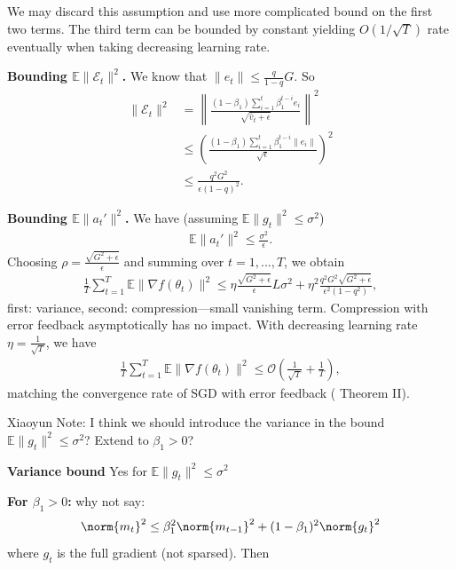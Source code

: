 \documentclass[11pt]{article}
\begin{document}
We may discard this assumption and use more complicated bound on the first two terms. The third term can be bounded by constant yielding $O(1/\sqrt T)$ rate eventually when taking decreasing learning rate.

\textbf{Bounding $\mathbb E\|\mathcal E_t\|^2$.} We know that $\|e_t\|\leq \frac{q}{1-q} G$. So
\begin{align*}
    \|\mathcal E_t\|^2&=\left\| \frac{(1-\beta_1)\sum_{i=1}^{t} \beta_1^{t-i} e_i}{\sqrt{\hat v_t+\epsilon}} \right\|^2\\
    &\leq \left(\frac{(1-\beta_1)\sum_{i=1}^{t} \beta_1^{t-i} \|e_i\|}{\sqrt\epsilon}\right)^2 \\
    &\leq \frac{q^2G^2}{\epsilon(1-q)^2}.
\end{align*}

\textbf{Bounding $\mathbb E\|a_t'\|^2$.} We have {\color{red} (assuming $\mathbb E\|g_t\|^2\leq \sigma^2$)}
\begin{align*}
    \mathbb E\|a_t'\|^2\leq \frac{\sigma^2}{\epsilon}.
\end{align*}
Choosing $\rho=\frac{\sqrt{G^2+\epsilon}}{\epsilon}$ and summing over $t=1,...,T$, we obtain
\begin{align*}
    \frac{1}{T}\sum_{t=1}^T\mathbb E\|\nabla f(\theta_t)\|^2\leq \eta\frac{\sqrt{G^2+\epsilon}}{\epsilon}L\sigma^2+\eta^2\frac{q^2G^2 \sqrt{G^2+\epsilon}}{\epsilon^2(1-q^2)},
\end{align*}
{\color{red} first: variance, second: compression---small vanishing term. Compression with error feedback asymptotically has no impact.} With decreasing learning rate $\eta=\frac{1}{\sqrt{T}}$, we have
\begin{align*}
    \frac{1}{T}\sum_{t=1}^T\mathbb E\|\nabla f(\theta_t)\|^2\leq \mathcal O(\frac{1}{\sqrt T}+\frac{1}{T}),
\end{align*}
matching the convergence rate of SGD with error feedback (\cite{karimireddy2019error} Theorem II).

{\color{red} Xiaoyun Note: I think we should introduce the variance in the bound $\mathbb E\|g_t\|^2\leq \sigma^2$? Extend to $\beta_1>0$?}

\textbf{Variance bound} Yes for $\mathbb E\|g_t\|^2\leq \sigma^2$


\textbf{For $\beta_1>0$:} why not say:
\begin{equation}
\norm{m_t}^2  \leq \beta_1^2 \norm{m_{t-1}}^2 + (1 - \beta_1)^2 \norm{g_t}^2
\end{equation}
where $g_t$ is the full gradient (not sparsed).
Then 
\end{document}
